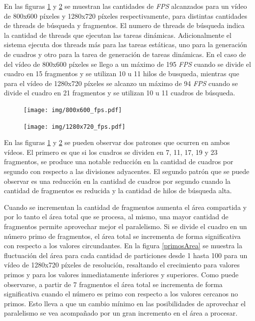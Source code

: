 En las figuras \ref{800fps} y \ref{1280fps} se muestran las cantidades de
\emph{FPS} alcanzados para un vídeo de 800x600 píxeles y 1280x720 píxeles
respectivamente, para distintas cantidades de threads de búsqueda y fragmentos.
El numero de threads de búsqueda indica la cantidad de threads que ejecutan las
tareas dinámicas. Adicionalmente el sistema ejecuta dos threads más para las
tareas estáticas, uno para la generación de cuadros y otro para la tarea de
generación de tareas dinámicas. En el caso de del vídeo de 800x600 píxeles se
llego a un máximo de 195 \emph{FPS} cuando se divide el cuadro en 15 fragmentos
y se utilizan 10 u 11 hilos de busqueda, mientras que para el vídeo de 1280x720
píxeles se alcanzo un máximo de 94 \emph{FPS} cuando se divide el cuadro en 21
fragmentos y se utilizan 10 u 11 cuadros de búsqueda.

\begin{figure}[!h]

	\texttt{[image: img/800x600\_fps.pdf]}
	\caption{}
	\label{800fps}

\end{figure}

\begin{figure}[!h]

	\texttt{[image: img/1280x720\_fps.pdf]}
	\caption{}
	\label{1280fps}

\end{figure}

En las figuras \ref{800fps} y \ref{1280fps} se pueden observar dos patrones que
ocurren en ambos vídeos. El primero es que si los cuadros se dividen en 7, 11,
17, 19 y 23 fragmentos, se produce una notable reducción en la cantidad de
cuadros por segundo con respecto a las divisiones adyacentes. El segundo patrón
que se puede observar es una reducción en la cantidad de cuadros por segundo
cuando la cantidad de fragmentos es reducida y la cantidad de hilos de búsqueda
alta.

Cuando se incrementan la cantidad de fragmentos aumenta el área compartida y por
lo tanto el área total que se procesa, al mismo, una mayor cantidad de
fragmentos permite aprovechar mejor el paralelismo. Si se divide el cuadro en un
número primo de fragmentos, el área total se incrementa de forma significativa
con respecto a los valores circundantes. En la figura \ref{primosArea} se
muestra la fluctuación del área para cada cantidad de particiones desde 1 hasta
100 para un vídeo de 1280x720 píxeles de resolución, resaltando el crecimiento
para valores primos y para los valores inmediatamente inferiores y superiores.
Como puede observarse, a partir de 7 fragmentos el área total se incrementa de
forma significativa cuando el número es primo con respecto a los valores
cercanos no primos. Esto lleva a que un cambio mínimo en las posibilidades de
aprovechar el paralelismo se vea acompañado por un gran incremento en el área a
procesar.


